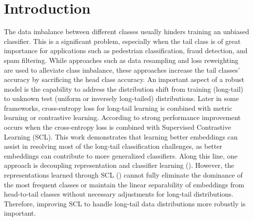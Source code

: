 \section{Introduction}
\label{sec1}
The data imbalance between different classes usually hinders training an unbiased classifier. This is a significant problem, especially when the tail class is of great importance for applications such as pedestrian classification, fraud detection, and spam filtering. While approaches such as data resampling and loss reweighting are used to alleviate class imbalance, these approaches increase the tail classes' accuracy by sacrificing the head class accuracy.
An important aspect of a robust model is the capability to address the distribution shift from training (long-tail) to unknown test (uniform or inversely long-tailed) distributions. Later in some frameworks, cross-entropy loss for long-tail learning is combined with metric learning or contrastive learning. According to \cite{elm} 
strong performance improvement occurs when the cross-entropy loss is combined with Supervised Contrastive Learning (SCL). This work demonstrates that learning better embeddings can assist in resolving most of the long-tail classification challenges, as better embeddings can contribute to more generalized classifiers. Along this line, one approach is decoupling representation and classifier learning (\cite{kang2019decoupling}). However, the representations learned through SCL (\cite{scl}) cannot fully eliminate the dominance of the most frequent classes or maintain the linear separability of embeddings from head-to-tail classes without necessary adjustments for long-tail distributions. Therefore, improving SCL to handle long-tail data distributions more robustly is important.

